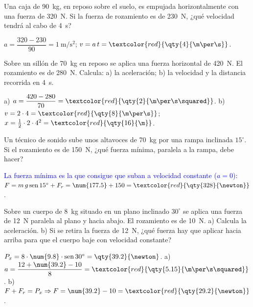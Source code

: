 \begin{exercise}
    Una caja de \qty{90}{\kg}, en reposo sobre el suelo, es empujada horizontalmente con una fuerza de \qty{320}{\newton}. Si la
    fuerza de rozamiento es de \qty{230}{\newton}, ¿qué velocidad tendrá al cabo de \qty{4}{\s}?
    \begin{solu}
        \(a = \dfrac{320 - 230}{90} = \qty{1}{\m\per\s\squared}\); \(v = a\,t = \textcolor{red}{\qty{4}{\m\per\s}}\).
    \end{solu}
\end{exercise}

\begin{exercise}
    Sobre un sillón de \qty{70}{\kg} en reposo se aplica una fuerza horizontal de \qty{420}{\newton}. El rozamiento es de
    \qty{280}{\newton}. Calcula: a) la aceleración; b) la velocidad y la distancia recorrida en \qty{4}{\s}.
    \begin{solu}
        a) \(a = \dfrac{420 - 280}{70} = \textcolor{red}{\qty{2}{\m\per\s\squared}}\). b) \(v = 2 \cdot 4 = \textcolor{red}{\qty{8}{\m\per\s}}\);
        \(x = \frac{1}{2} \cdot 2 \cdot 4^2 = \textcolor{red}{\qty{16}{\m}}\).
    \end{solu}
\end{exercise}

\begin{exercise}
    Un técnico de sonido sube unos altavoces de \qty{70}{\kg} por una rampa inclinada \(15^\circ\). Si el rozamiento es de
    \qty{150}{\newton}, ¿qué fuerza mínima, paralela a la rampa, debe hacer?
    \begin{solu}
        \textcolor{blue}{La fuerza mínima es la que consigue que suban a velocidad constante (\(a = 0\)):}
        \(F = m\,g\sen 15^\circ + F_r = \num{177.5} + 150 = \textcolor{red}{\qty{328}{\newton}}\).
    \end{solu}
\end{exercise}

\begin{exercise}
    Sobre un cuerpo de \qty{8}{\kg} situado en un plano inclinado \(30^\circ\) se aplica una fuerza de \qty{12}{\newton} paralela
    al plano y hacia abajo. El rozamiento es de \qty{10}{\newton}. a) Calcula la aceleración. b) Si se retira la fuerza de
    \qty{12}{\newton}, ¿qué fuerza hay que aplicar hacia arriba para que el cuerpo baje con velocidad constante?
    \begin{solu}
        \(P_x = 8 \cdot \num{9.8} \cdot \sen 30^\circ = \qty{39.2}{\newton}\). a) \(a = \dfrac{12 + \num{39.2} - 10}{8} =
        \textcolor{red}{\qty{5.15}{\m\per\s\squared}}\). b) \(F + F_r = P_x \Rightarrow F = \num{39.2} - 10 =
        \textcolor{red}{\qty{29.2}{\newton}}\).
    \end{solu}
\end{exercise}

